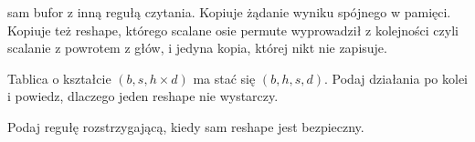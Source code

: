 \begin{testexercises}
{  sam bufor z inną regułą czytania. Kopiuje żądanie wyniku spójnego w pamięci.
  Kopiuje też reshape, którego scalane osie permute wyprowadził z kolejności
  \dash{} czyli scalanie z powrotem z głów, i jedyna kopia, której nikt nie
  zapisuje.}
\item Tablica o kształcie $(b, s, h \times d)$ ma stać się $(b, h, s, d)$.
  Podaj działania po kolei i powiedz, dlaczego jeden reshape nie wystarczy.
\item Podaj regułę rozstrzygającą, kiedy sam reshape jest bezpieczny.
\end{testexercises}

